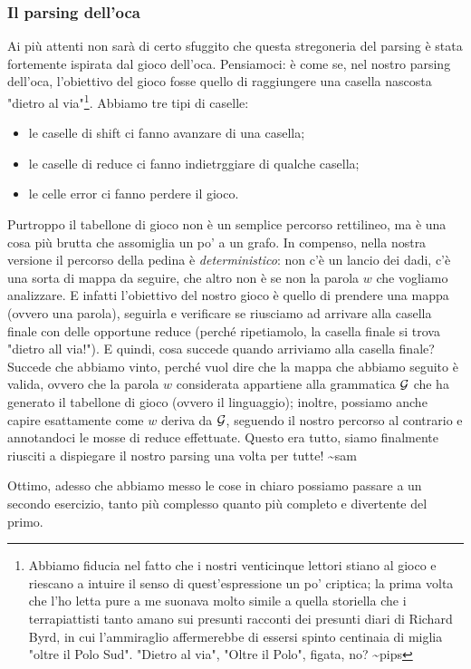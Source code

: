 \documentclass[class=book, crop=false, oneside, 12pt]{standalone}
\begin{document}
\subsubsection{Il parsing dell'oca}
Ai più attenti non sarà di certo sfuggito che questa stregoneria del parsing è stata fortemente ispirata dal gioco dell'oca. Pensiamoci: è come se, nel nostro parsing dell'oca, l'obiettivo del gioco fosse quello di raggiungere una casella nascosta "dietro al via"\footnote{Abbiamo fiducia nel fatto che i nostri venticinque lettori stiano al gioco e riescano a intuire il senso di quest'espressione un po' criptica; la prima volta che l'ho letta pure a me suonava molto simile a quella storiella che i terrapiattisti tanto amano sui presunti racconti dei presunti diari di Richard Byrd, in cui l'ammiraglio affermerebbe di essersi spinto centinaia di miglia "oltre il Polo Sud". "Dietro al via", "Oltre il Polo", figata, no? \textasciitilde pips}. Abbiamo tre tipi di caselle:
\begin{itemize}
    \item le caselle di shift ci fanno avanzare di una casella;
    \item le caselle di reduce ci fanno indietrggiare di qualche casella;
    \item le celle error ci fanno perdere il gioco.
\end{itemize}
Purtroppo il tabellone di gioco non è un semplice percorso rettilineo, ma è una cosa più brutta che assomiglia un po' a un grafo. In compenso, nella nostra versione il percorso della pedina è \emph{deterministico}: non c'è un lancio dei dadi, c'è una sorta di mappa da seguire, che altro non è se non la parola \(w\) che vogliamo analizzare. E infatti l'obiettivo del nostro gioco è quello di prendere una mappa (ovvero una parola), seguirla e verificare se riusciamo ad arrivare alla casella finale con delle opportune reduce (perché ripetiamolo, la casella finale si trova "dietro all via!"). E quindi, cosa succede quando arriviamo alla casella finale? Succede che abbiamo vinto, perché vuol dire che la mappa che abbiamo seguito è valida, ovvero che la parola \(w\) considerata appartiene alla grammatica \(\mathcal{G}\) che ha generato il tabellone di gioco (ovvero il linguaggio); inoltre, possiamo anche capire esattamente come \(w\) deriva da \(\mathcal{G}\), seguendo il nostro percorso al contrario e annotandoci le mosse di reduce effettuate. Questo era tutto, siamo finalmente riusciti a dispiegare il nostro parsing una volta per tutte! \textasciitilde sam

Ottimo, adesso che abbiamo messo le cose in chiaro possiamo passare a un secondo esercizio, tanto più complesso quanto più completo e divertente del primo.
\end{document}

